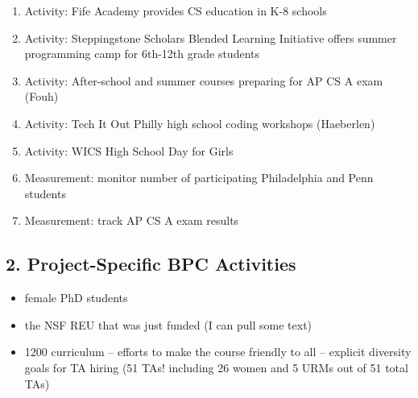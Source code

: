 \begin{enumerate}
\item Activity: Fife Academy provides CS education in K-8 schools
\item Activity: Steppingstone Scholars Blended Learning Initiative offers summer programming camp for 6th-12th grade students
\item Activity: After-school and summer courses preparing for AP CS A exam (Fouh)
\item Activity: Tech It Out Philly high school coding workshops (Haeberlen)
\item Activity: WICS High School Day for Girls
\item Measurement: monitor number of participating Philadelphia and Penn students
\item Measurement: track AP CS A exam results
\end{enumerate}

\subsection*{2. Project-Specific BPC Activities}


\begin{itemize}
\item female PhD students
\item the NSF REU that was just funded  (I can pull some text)
\item 1200 curriculum -- efforts to make the course friendly to all --
explicit diversity goals for TA hiring (51 TAs! including 26 women
and 5 URMs out of 51 total TAs)
\end{itemize}



